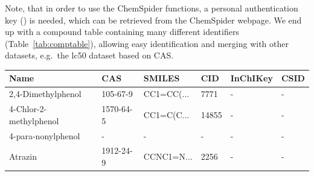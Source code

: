 \documentclass[article, shortnames]{jss}\usepackage[]{graphicx}\usepackage[]{color}
\providecommand{\DIFaddbegin}{} %
\providecommand{\DIFaddend}{} %
\providecommand{\DIFaddbeginFL}{} %
\providecommand{\DIFdelbeginFL}{} %
\providecommand{\DIFdelendFL}{} %
\begin{document}
\DIFaddend Note, that in order to use the ChemSpider functions, a personal authentication key () is needed, which can be retrieved from the ChemSpider webpage. 
We end up with a compound table containing many different identifiers (Table~\ref{tab:comptable}), allowing easy identification and merging with other datasets, e.g.\DIFaddbegin \ \DIFaddend the lc50 dataset based on CAS.

\begin{table}[ht]
\centering
\DIFdelbeginFL %
\DIFdelendFL \DIFaddbeginFL \begin{CodeChunk}
\begin{tabular}{llllll}
  \toprule
Name & CAS & SMILES & CID & InChIKey & CSID \\ 
  \midrule
2,4-Dimethylphenol & 105-67-9 & CC1=CC(... & 7771 & - & - \\ 
  4-Chlor-2-methylphenol & 1570-64-5 & CC1=C(C... & 14855 & - & - \\ 
  4-para-nonylphenol & - & - & - & - & - \\ 
  Atrazin & 1912-24-9 & CCNC1=N... & 2256 & - & - \\ 

\end{tabular}
\end{CodeChunk}
\end{table}
\end{document}
